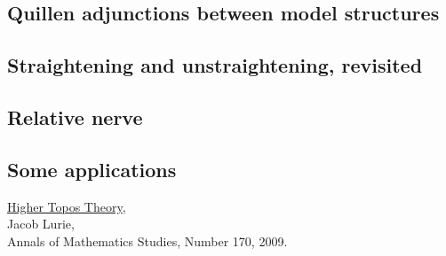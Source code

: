 \documentclass[a4paper, 12pt]{amsart}
\newcommand{\8}{\infty}
\begin{document}
\subsection{Quillen adjunctions between model structures}
\subsection{Straightening and unstraightening, revisited}
\subsection{Relative nerve}
\subsection{Some applications}


\begin{thebibliography}{99}
  \href{https://arxiv.org/abs/math/0608040}{Higher Topos Theory}, \\
  Jacob Lurie, \\
  Annals of Mathematics Studies, Number 170, 2009.
\end{thebibliography}
\end{document}
